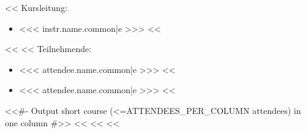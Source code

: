                 \begin{minipage}[t]{0.5\textwidth}
                    <<%
                        Kursleitung:
                        \begin{itemize}
                            <<%
                                \item <<< instr.name.common|e >>>
                            <<%
                        \end{itemize}
                    <<%
                    <<%
                    Teilnehmende:
                    \begin{itemize}
                        <<%
                            \item <<< attendee.name.common|e >>>
                        <<%
                    \end{itemize}
                \end{minipage}%
                \begin{minipage}[t]{0.5\textwidth}
                    \begin{itemize}
                        <<%
                            \item <<< attendee.name.common|e >>>
                        <<%
                    \end{itemize}
                \end{minipage}

            <<#- Output short course (<=ATTENDEES_PER_COLUMN attendees) in one column #>>
            <<%
                <<%
                    <<%

